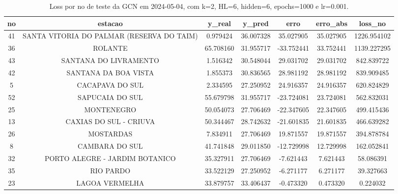 \begin{table}[h]
\centering
\caption{Loss por no de teste da GCN em 2024-05-04, com k=2, HL=6, hidden=6, epochs=1000 e lr=0.001.}
\label{tab:gcn_loss_k2_hl6_h6_e1000_d20240504}
\begin{tabular}{ccccccc}
\toprule
no & estacao & y\_real & y\_pred & erro & erro\_abs & loss\_no \\
\midrule
41 & SANTA VITORIA DO PALMAR (RESERVA DO TAIM) & 0.979424 & 36.007328 & 35.027905 & 35.027905 & 1226.954102 \\
36 & ROLANTE & 65.708160 & 31.955717 & -33.752441 & 33.752441 & 1139.227295 \\
43 & SANTANA DO LIVRAMENTO & 1.516342 & 30.548044 & 29.031702 & 29.031702 & 842.839722 \\
42 & SANTANA DA BOA VISTA & 1.855373 & 30.836565 & 28.981192 & 28.981192 & 839.909485 \\
5 & CACAPAVA DO SUL & 2.334595 & 27.250952 & 24.916357 & 24.916357 & 620.824829 \\
52 & SAPUCAIA DO SUL & 55.679798 & 31.955717 & -23.724081 & 23.724081 & 562.832031 \\
25 & MONTENEGRO & 50.054073 & 27.706469 & -22.347605 & 22.347605 & 499.415436 \\
13 & CAXIAS DO SUL - CRIUVA & 50.344467 & 28.742632 & -21.601835 & 21.601835 & 466.639282 \\
26 & MOSTARDAS & 7.834911 & 27.706469 & 19.871557 & 19.871557 & 394.878784 \\
8 & CAMBARA DO SUL & 41.741848 & 29.011850 & -12.729998 & 12.729998 & 162.052841 \\
32 & PORTO ALEGRE - JARDIM BOTANICO & 35.327911 & 27.706469 & -7.621443 & 7.621443 & 58.086391 \\
35 & RIO PARDO & 33.522129 & 27.250952 & -6.271177 & 6.271177 & 39.327663 \\
23 & LAGOA VERMELHA & 33.879757 & 33.406437 & -0.473320 & 0.473320 & 0.224032 \\
\bottomrule
\end{tabular}
\end{table}
